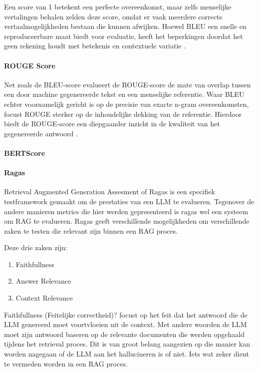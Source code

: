     Een score van 1 betekent een perfecte overeenkomst, maar zelfs menselijke vertalingen behalen zelden deze score, omdat er vaak meerdere correcte vertaalmogelijkheden bestaan die kunnen afwijken. Hoewel BLEU een snelle en reproduceerbare maat biedt voor evaluatie, heeft het beperkingen doordat het geen rekening houdt met betekenis en contextuele variatie \autocite{papineni-etal-2002-bleu}.
    
    \paragraph{ROUGE Score}
    
    Net zoals de BLEU-score evalueert de ROUGE-score de mate van overlap tussen een door machine gegenereerde tekst en een menselijke referentie. Waar BLEU echter voornamelijk gericht is op de precisie van exacte n-gram overeenkomsten, focust ROUGE sterker op de inhoudelijke dekking van de referentie. Hierdoor biedt de ROUGE-score een diepgaander inzicht in de kwaliteit van het gegenereerde antwoord \autocite{ganesan2018rouge20updatedimproved}.
    
    \paragraph{BERTScore}
    
    \paragraph{Ragas}
    
    Retrieval Augmented Generation Assesment of Ragas is een specifiek testframework gemaakt om de prestaties van een LLM te evalueren. Tegenover de andere manieren metrics die hier werden gepresenteerd is ragas wel een systeem om RAG te evalueren. Ragas geeft verschillende mogelijkheden om verschillende zaken te testen die relevant zijn binnen een RAG proces.
    
    Deze drie zaken zijn:
        \begin{enumerate}
        \item Faithfullness
        \item Answer Relevance
        \item Context Relevance
    \end{enumerate}
    
    Faithfullness (Feitelijke correctheid)? focust op het feit dat het antwoord die de LLM genereerd moet voortvloeien uit de context. Met andere woorden de LLM moet zijn antwoord baseren op de relevante documenten die werden opgehaald tijdens het retrieval proces. Dit is van groot belang aangezien op die manier kan worden nagegaan of de LLM aan het hallucineren is of niet. Iets wat zeker dient te vermeden worden in een RAG proces.
    
